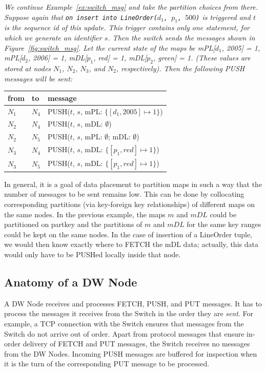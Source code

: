 \begin{example}\em
\label{ex:switch_msg2}
We continue Example~\ref{ex:switch_msg} and take the partition choices
from there.
Suppose again that
{\tt on insert into LineOrder($d_1$, $p_1$, $500$)} is triggered and $t$ is
the sequence id of this update.
This trigger contains only one statement,
for which we generate an identifier $s$.
Then the switch sends the messages shown in Figure~\ref{fig:switch_msg}.
%
Let the current state of the maps be
mPL[$d_1$, 2005] = 1, mPL[$d_2$, 2006] = 1, mDL[$p_1$, red] = 1,
mDL[$p_2$, green] = 1. (These values are stored at nodes
$N_1$, $N_2$, $N_3$, and $N_2$, respectively).
Then the following PUSH messages will be sent:
\begin{center}
\begin{tabular}{ll|l}
from & to & message \\
\hline
$N_1$ & $N_4$ & PUSH($t$, $s$, mPL: $\{ [d_1, 2005] \mapsto 1 \}$) \\
$N_2$ & $N_4$ & PUSH($t$, $s$, mDL: $\emptyset$) \\
$N_2$ & $N_5$ & PUSH($t$, $s$, mPL: $\emptyset$; mDL: $\emptyset$) \\
$N_3$ & $N_4$ & PUSH($t$, $s$, mDL: $\{ [p_1, red] \mapsto 1 \}$) \\
$N_3$ & $N_5$ & PUSH($t$, $s$, mDL: $\{ [p_1, red] \mapsto 1 \}$) \\
\end{tabular}
\end{center}
\end{example}


In general, it is a goal of data placement
to partition maps in such a way that the number of
messages to be sent remains low. This can be done by collocating
corresponding partitions (via key-foreign key relationships)
of different maps on the same nodes.
In the previous example, the maps $m$ and $mDL$
could be partitioned on partkey and the partitions of $m$ and $mDL$ for the
same key ranges could be kept on the same nodes.
In the case of insertion of a LineOrder tuple, we would then know exactly
where to FETCH the mDL data; actually, this data would only have to be
PUSHed locally inside that node.


\subsection{Anatomy of a DW Node}


A DW Node receives and processes FETCH, PUSH, and PUT messages.
It has to process the messages it receives from the Switch 
in the order they are {\em sent}\/. For example, a
TCP connection with the Switch ensures that messages from the 
Switch do not arrive out of order. Apart from protocol messages
that ensure in-order delivery of FETCH and PUT messages, the Switch receives no
messages from the DW Nodes.
Incoming PUSH messages are buffered for inspection when it is the turn of
the corresponding PUT message to be processed.

